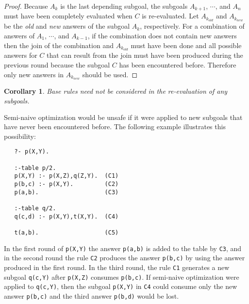 \documentclass{tlp}
\begin{document}
\begin{proof}
Because $A_k$ is the last depending subgoal, the subgoals $A_{k+1}$, $\cdots$, and $A_n$ must have been completely evaluated when $C$ is re-evaluated. Let $A_{k_{old}}$ and $A_{k_{new}}$ be the {\it old} and {\it new} answers of the subgoal $A_k$, respectively. For a combination of answers of $A_1$, $\cdots$, and $A_{k-1}$, if the combination does not contain new answers then the join of the combination and $A_{k_{old}}$ must have been done and all possible answers for $C$ that can result from the join must have been produced during the previous round because the subgoal $C$ has been encountered before. Therefore only new answers in $A_{k_{new}}$ should be used.
\end{proof}

\newtheorem{corollary}{Corollary}
\begin{corollary}
Base rules need not be considered in the re-evaluation of any subgoals.
\end{corollary}

Semi-naive optimization would be unsafe if it were applied to new subgoals that have never been encountered before. The following example illustrates this possibility: 

\begin{verbatim}
   ?- p(X,Y).

   :-table p/2.
   p(X,Y) :- p(X,Z),q(Z,Y).  (C1)
   p(b,c) :- p(X,Y).         (C2)
   p(a,b).                   (C3)

   :-table q/2.
   q(c,d) :- p(X,Y),t(X,Y).  (C4)

   t(a,b).                   (C5)
\end{verbatim}

\noindent
In the first round of {\tt p(X,Y)} the answer {\tt p(a,b)} is added to the table by {\tt C3}, and in the second round the rule {\tt C2} produces the answer {\tt p(b,c)} by using the answer produced in the first round. In the third round, the rule  {\tt C1} generates a new subgoal {\tt q(c,Y)} after {\tt p(X,Z)} consumes {\tt p(b,c)}. If semi-naive optimization were applied to {\tt q(c,Y)}, then the subgoal {\tt p(X,Y)} in {\tt C4} could consume only the new answer {\tt p(b,c)} and the third answer {\tt p(b,d)} would be lost.
\end{document}
